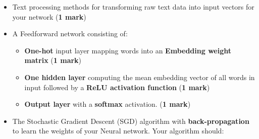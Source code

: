 \documentclass[11pt]{article}
\providecommand{\tightlist}{%
      \setlength{\itemsep}{0pt}\setlength{\parskip}{0pt}}
\begin{document}
\begin{itemize}
\item
  Text processing methods for transforming raw text data into input
  vectors for your network (\textbf{1 mark})
\item
  A Feedforward network consisting of:

  \begin{itemize}
  \tightlist
  \item
    \textbf{One-hot} input layer mapping words into an \textbf{Embedding
    weight matrix} (\textbf{1 mark})
  \item
    \textbf{One hidden layer} computing the mean embedding vector of all
    words in input followed by a \textbf{ReLU activation function}
    (\textbf{1 mark})
  \item
    \textbf{Output layer} with a \textbf{softmax} activation. (\textbf{1
    mark})
  \end{itemize}
\item
  The Stochastic Gradient Descent (SGD) algorithm with
  \textbf{back-propagation} to learn the weights of your Neural network.
  Your algorithm should:


\end{itemize}
\end{document}
